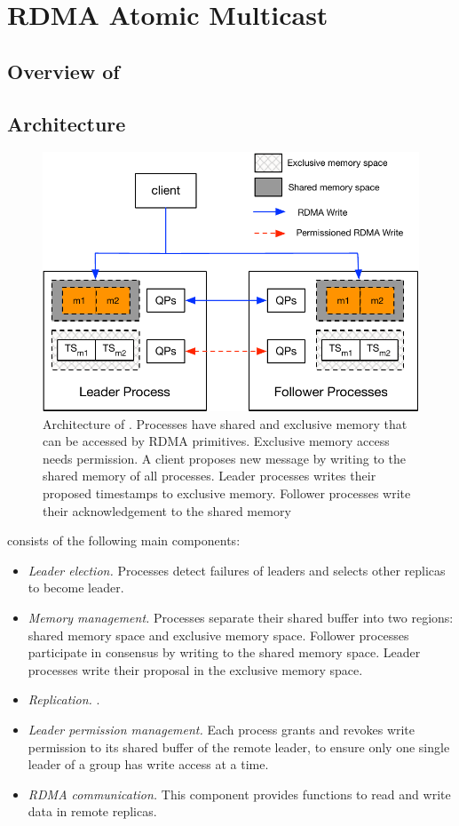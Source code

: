 \section{RDMA Atomic Multicast}
\label{sec:rdma-atomic-multicast}
\subsection{Overview of \libname}

\subsection{Architecture}


\begin{figure}[ht!]
  \centering
  \includegraphics[width=1\linewidth]{figures/architecture}
  \caption{Architecture of \libname. Processes have shared and exclusive memory that can be accessed by RDMA primitives. Exclusive memory access needs permission. A client proposes new message by writing to the shared memory of all processes. Leader processes writes their proposed timestamps to exclusive memory. Follower processes write their acknowledgement to the shared memory}
  \label{fig:normal_operation_time}
\end{figure}


\libname consists of the following main components:
\begin{itemize}
  \item \emph{Leader election.} Processes detect failures of leaders and
  selects other replicas to become leader.
  \item \emph{Memory management.} Processes separate their shared buffer into two
  regions: shared memory space and exclusive memory space. Follower processes
  participate in consensus by writing to the shared memory space. Leader
  processes write their proposal in the exclusive memory space.
  \item \emph{Replication.} .
  \item \emph{Leader permission management.} Each process grants and revokes
  write permission to its shared buffer of the remote leader, to ensure only one
  single leader of a group has write access at a time.
  \item \emph{RDMA communication.} This component provides functions to read and
  write data in remote replicas.
\end{itemize}

